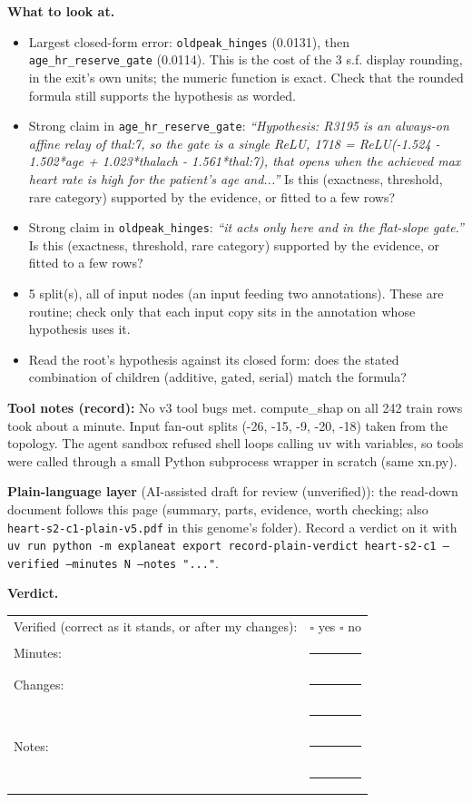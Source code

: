 \documentclass[a4paper,11pt]{article}
\begin{document}
\textbf{What to look at.}
\begin{itemize}
\item Largest closed-form error: \texttt{oldpeak\_\allowbreak{}hinges} (0.0131), then \texttt{age\_\allowbreak{}hr\_\allowbreak{}reserve\_\allowbreak{}gate} (0.0114). This is the cost of the 3 s.f. display rounding, in the exit's own units; the numeric function is exact. Check that the rounded formula still supports the hypothesis as worded.
\item Strong claim in \texttt{age\_\allowbreak{}hr\_\allowbreak{}reserve\_\allowbreak{}gate}: \emph{``Hypothesis: R3195 is an always-on affine relay of thal:7, so the gate is a single ReLU, 1718 = ReLU(-1.524 - 1.502*age + 1.023*thalach - 1.561*thal:7), that opens when the achieved max heart rate is high for the patient's age and...''} Is this (exactness, threshold, rare category) supported by the evidence, or fitted to a few rows?
\item Strong claim in \texttt{oldpeak\_\allowbreak{}hinges}: \emph{``it acts only here and in the flat-slope gate.''} Is this (exactness, threshold, rare category) supported by the evidence, or fitted to a few rows?
\item 5 split(s), all of input nodes (an input feeding two annotations). These are routine; check only that each input copy sits in the annotation whose hypothesis uses it.
\item Read the root's hypothesis against its closed form: does the stated combination of children (additive, gated, serial) match the formula?
\end{itemize}
\textbf{Tool notes (record):} No v3 tool bugs met. compute\_\allowbreak{}shap on all 242 train rows took about a minute. Input fan-out splits (-26, -15, -9, -20, -18) taken from the topology. The agent sandbox refused shell loops calling uv with variables, so tools were called through a small Python subprocess wrapper in scratch (same xn.py).

\textbf{Plain-language layer} (AI-assisted draft for review (unverified)): the read-down document follows this page (summary, parts, evidence, worth checking; also \texttt{heart-s2-c1-plain-v5.pdf} in this genome's folder). Record a verdict on it with \texttt{uv run python -m explaneat export record-plain-verdict heart-s2-c1 --verified --minutes N --notes "..."}.

\textbf{Verdict.}

\begin{tabularx}{\linewidth}{@{}lX@{}}
Verified (correct as it stands, or after my changes): & $\square$ yes \quad $\square$ no \\[4pt]
Minutes: & \rule{3cm}{0.4pt} \\[4pt]
Changes: & \rule{\linewidth}{0.4pt} \\[10pt]
 & \rule{\linewidth}{0.4pt} \\[4pt]
Notes: & \rule{\linewidth}{0.4pt} \\[10pt]
 & \rule{\linewidth}{0.4pt} \\
\end{tabularx}
\end{document}
